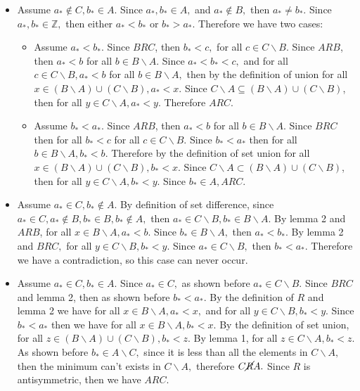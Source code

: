 \documentclass[12pt, letterpaper]{article}
\newcommand{\Z}{\mathbb{Z}}
\begin{document}
\begin{itemize}
\begin{itemize}
			\item Assume $a_* \not \in C, b_* \in A.$ Since $a_*, b_* \in A,$ and $a_* \not \in B,$ then $a_* \neq b_*.$   Since $a_*, b_* \in \Z,$ then either $a_* < b_*$ or $b_* > a_*.$ Therefore we have two cases:
			\begin{itemize}
				\item Assume $a_* < b_*.$  Since $BRC$, then $b_* < c,$ for all $c \in C\backslash B.$  Since $ARB$, then $a_* < b$ for all $b \in B \backslash A.$ 	Since $a_* < b_* < c,$ and for all $c \in C\backslash B, a_* < b$ for all $b \in B \backslash A,$ then by the definition of union for all $x \in  (B \backslash A) \cup (C \backslash B), a_* < x.$  Since $C\backslash A \subseteq (B \backslash A) \cup (C \backslash B)$, then for all $y \in C\backslash A, a_* < y.$  Therefore $ARC.$
				\item Assume $b_* < a_*.$  Since $ARB$, then $a_* < b$ for all $b \in B \backslash A$.  Since $BRC$ then for all $b_* < c$ for all $c\in C \backslash B.$  Since $b_* < a_*$ then for all $b \in B \backslash A, b_* < b$.  Therefore by the definition of set union for all $x \in (B \backslash A) \cup (C \backslash B), b_* < x.$  Since $C \backslash A \subset (B \backslash A) \cup (C \backslash B)$, then for all $y \in C \backslash A, b_* < y.$  Since $b_* \in A, ARC.$
			\end{itemize}
			  
			\item Assume $a_* \in C, b_* \not \in A.$  By definition of set difference, since $a_* \in C, a_* \not \in B,b_* \in B, b_* \not \in A,$ then $a_* \in C \backslash B, b_* \in B \backslash A.$  By lemma 2 and $ARB$, for all $x \in B \backslash A, a_* < b.$  Since $b_* \in B \backslash A,$ then $a_* < b_*.$  By lemma 2 and $BRC,$ for all $y \in C \backslash B, b_* < y.$  Since $a_* \in C \backslash B,$ then $b_* < a_*.$  Therefore we have a contradiction, so this case can never occur.   
			\item Assume $a_* \in C, b_* \in A.$  Since $a_* \in C,$ as shown before $a_* \in C \backslash B.$  Since $BRC$ and lemma 2, then as shown before $b_* < a_*.$  By the definition of $R$ and lemma 2 we have for all $x \in B \backslash A, a_* < 	x,$ and for all $y \in C \backslash B, b_* < y.$  Since $b_* < a_*$ then we have for all $x \in B \backslash A, b_* < x.$  By the definition of set union, for all $z \in  (B \backslash A) \cup (C \backslash B), b_* < z.$ By lemma 1, for all $z\in C \backslash A, b_* < z.$  As shown before $b_* \in A \backslash C,$ since it is less than all the elements in $C\backslash A,$ then the minimum can't exists in $C\backslash A,$ therefore $C \cancel{R} A.$  Since $R$ is antisymmetric, then we have $ARC.$
		\end{itemize}
	\end{itemize}
\end{document}
